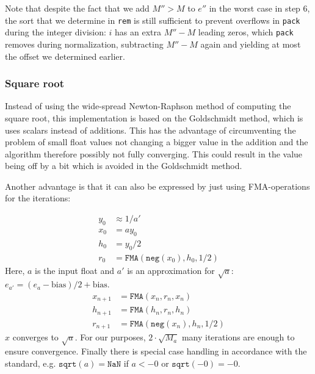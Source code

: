 \documentclass[a4paper,UKenglish,cleveref, autoref, thm-restate]{lipics-v2019}
\begin{document}
Note that despite the fact that we add $M'' > M$ to $e''$ in the worst case in step 6, the sort that we determine in \verb|rem| is still sufficient to prevent overflows in \verb|pack| during the integer division: $i$ has an extra $M'' - M$ leading zeros, which \verb|pack| removes during normalization, subtracting $M'' - M$ again and yielding at most the offset we determined earlier. 

\subsubsection{Square root}
Instead of using the wide-spread Newton-Raphson method of computing the square root, this implementation is based on the Goldschmidt method, which is uses scalars instead of additions. This has the advantage of circumventing the problem of small float values not changing a bigger value in the addition and the algorithm therefore possibly not fully converging. This could result in the value being off by a bit which is avoided in the Goldschmidt method. 

Another advantage is that it can also be expressed by just using FMA-operations for the iterations:

\begin{align*}
y_0 &\approx 1/a' \\
x_0 &= ay_0 \\
h_0 &= y_0/2 \\
r_0 &= \texttt{FMA}(\texttt{neg}(x_0), h_0, 1/2)
\end{align*}
Here, $a$ is the input float and $a'$ is an approximation for $\sqrt{a}$: $ e_{a'} = (e_a - \text{bias}) / 2 + \text{bias}$.
\begin{align*}
x_{n+1} &= \texttt{FMA}(x_{n}, r_{n} , x_{n})\\
h_{n+1} &= \texttt{FMA}(h_{n}, r_{n}, h_{n})\\
r_{n+1} &= \texttt{FMA}(\texttt{neg}(x_{n}), h_{n}, 1/2)
\end{align*}
$x$ converges to $\sqrt{a}$. For our purposes, $2\cdot\sqrt{M_a}$ many iterations are enough to ensure convergence.
Finally there is special case handling in accordance with the standard, e.g. $\texttt{sqrt}(a) = \texttt{NaN}$ if $a < -0$ or $\texttt{sqrt}(-0) = -0$.
\end{document}

